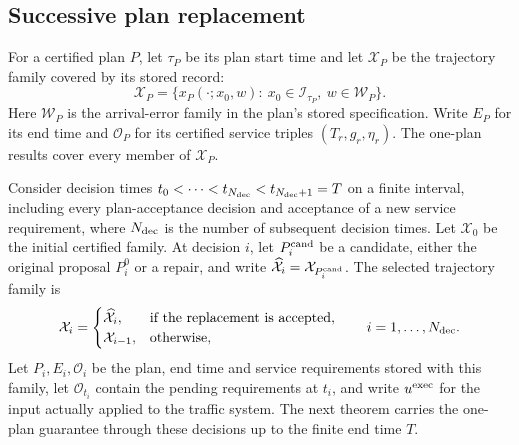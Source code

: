 \documentclass[final]{cas-sc}
\theoremstyle{definition}
\theoremstyle{plain}
\theoremstyle{definition}
\theoremstyle{plain}
\begin{document}
\subsection{Successive plan replacement}
\label{sec:new-execution}

For a certified plan $P$, let $\tau_P$ be its plan start time and let
$\mathcal X_P$ be the trajectory family covered by its stored record:
\begin{equation}
\mathcal X_P=\{x_P(\cdot;x_0,w):\ x_0\in\mathcal I_{\tau_P},\
w\in\mathcal W_P\}.
\label{eq:execution-covered-family}
\end{equation}
Here $\mathcal W_P$ is the arrival-error family in the plan's stored
specification. Write $E_P$ for its end time and $\mathcal O_P$ for its
certified service triples $(T_r,g_r,\eta_r)$. The one-plan results
cover every member of $\mathcal X_P$.

Consider decision times
$t_0<\cdots<t_{N_{\rm dec}}<t_{N_{\rm dec}+1}=T$ on a finite interval,
including every plan-acceptance decision and acceptance of a new
service requirement, where $N_{\rm dec}$ is the number of subsequent
decision times. Let $\mathcal X_0$ be the initial certified family. At
decision $i$, let $P_i^{\rm cand}$ be a candidate, either the original
proposal $P_i^{0}$ or a repair, and write
$\widehat{\mathcal X}_i=\mathcal X_{P_i^{\rm cand}}$. The selected
trajectory family is
\begin{equation}
\mathcal X_i=\begin{cases}
\widehat{\mathcal X}_i,&\text{if the replacement is accepted},\\
\mathcal X_{i-1},&\text{otherwise},
\end{cases}
\qquad i=1,\ldots,N_{\rm dec}.
\label{eq:execution-family-update}
\end{equation}
Let $P_i,E_i,\mathcal O_i$ be the plan, end time and service
requirements stored with this family, let $\mathcal O_{t_i}$ contain
the pending requirements at $t_i$, and write $u^{\rm exec}$ for the
input actually applied to the traffic system. The next theorem carries
the one-plan guarantee through these decisions up to the finite end
time $T$.
\end{document}
